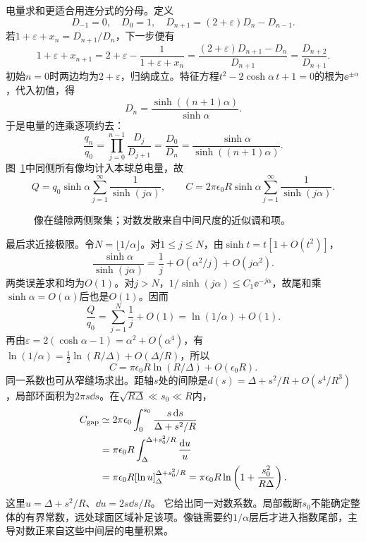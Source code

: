 \begin{solution}
电量求和更适合用连分式的分母。定义
\[D_{-1}=0,\quad D_0=1,\quad D_{n+1}=(2+\varepsilon)D_n-D_{n-1}.
\]
若$1+\varepsilon+x_n=D_{n+1}/D_n$，下一步便有
\[1+\varepsilon+x_{n+1}=2+\varepsilon-\frac1{1+\varepsilon+x_n}
=\frac{(2+\varepsilon)D_{n+1}-D_n}{D_{n+1}}=\frac{D_{n+2}}{D_{n+1}}.
\]
初始$n=0$时两边均为$2+\varepsilon$，归纳成立。特征方程$t^2-2\cosh\alpha\,t+1=0$的根为$\ee^{\pm\alpha}$，代入初值，得
\[D_n=\frac{\sinh((n+1)\alpha)}{\sinh\alpha}.
\]
于是电量的连乘逐项约去：
\[\frac{q_n}{q_0}=\prod_{j=0}^{n-1}\frac{D_j}{D_{j+1}}
=\frac{D_0}{D_n}=\frac{\sinh\alpha}{\sinh((n+1)\alpha)}.
\]
图~\ref{fig:es3-e6-s}中同侧所有像均计入本球总电量，故
\[Q=q_0\sinh\alpha\sum_{j=1}^\infty\frac1{\sinh(j\alpha)},\qquad
\boxed{C=2\pi\epsilon_0R\sinh\alpha\sum_{j=1}^\infty\frac1{\sinh(j\alpha)}}.
\]
\begin{figure}[H]\centering
{}
\caption{像在缝隙两侧聚集；对数发散来自中间尺度的近似调和项。}\label{fig:es3-e6-s}
\end{figure}
最后求近接极限。令$N=\lfloor1/\alpha\rfloor$。对$1\le j\le N$，由$\sinh t=t[1+O(t^2)]$，
\[\frac{\sinh\alpha}{\sinh(j\alpha)}
=\frac1j+O(\alpha^2/j)+O(j\alpha^2).
\]
两类误差求和均为$O(1)$。对$j>N$，$1/\sinh(j\alpha)\le C_1\ee^{-j\alpha}$，故尾和乘$\sinh\alpha=O(\alpha)$后也是$O(1)$。因而
\[\frac Q{q_0}=\sum_{j=1}^N\frac1j+O(1)=\ln(1/\alpha)+O(1).
\]
再由$\varepsilon=2(\cosh\alpha-1)=\alpha^2+O(\alpha^4)$，有$\ln(1/\alpha)=\tfrac12\ln(R/\Delta)+O(\Delta/R)$，所以
\[\boxed{C=\pi\epsilon_0R\ln(R/\Delta)+O(\epsilon_0R)}.
\]
同一系数也可从窄缝场求出。距轴$s$处的间隙是$d(s)=\Delta+s^2/R+O(s^4/R^3)$，局部环面积为$2\pi s\dd s$。在$\sqrt{R\Delta}\ll s_0\ll R$内，
\[\begin{aligned}
C_{\rm gap}&\simeq2\pi\epsilon_0\int_0^{s_0}\frac{s\mathop{}\!\mathrm d s}{\Delta+s^2/R}\\
&=\pi\epsilon_0R\int_\Delta^{\Delta+s_0^2/R}\frac{\mathop{}\!\mathrm d u}u\\
&=\pi\epsilon_0R[\ln u]_\Delta^{\Delta+s_0^2/R}
=\pi\epsilon_0R\ln\left(1+\frac{s_0^2}{R\Delta}\right).
\end{aligned}
\]
这里$u=\Delta+s^2/R$、$\dd u=2s\dd s/R$。
它给出同一对数系数。局部截断$s_0$不能确定整体的有界常数，远处球面区域补足该项。像链需要约$1/\alpha$层后才进入指数尾部，主导对数正来自这些中间层的电量积累。
\end{solution}

